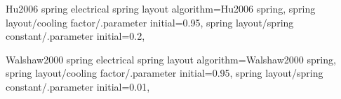 %
% 
%
\pgfgddeclarealgorithmkey
  {Hu2006 spring electrical}
  {spring layout}
  {
    algorithm=Hu2006 spring,
    spring layout/cooling factor/.parameter initial=0.95,
    spring layout/spring constant/.parameter initial=0.2,
  }



%
%
%
\pgfgddeclarealgorithmkey
  {Walshaw2000 spring electrical}
  {spring layout}
  {
    algorithm=Walshaw2000 spring,
    spring layout/cooling factor/.parameter initial=0.95,
    spring layout/spring constant/.parameter initial=0.01,
  }

